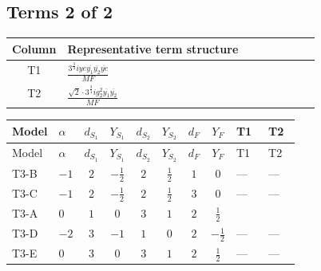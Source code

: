 \documentclass[8pt]{article}
\begin{document}
\begin{landscape}
\subsection*{Terms 2 of 2}
\begin{center}
\begin{tabular}{@{}c >{\raggedright\arraybackslash}p{0.82\linewidth}@{}}
\toprule
Column & Representative term structure \\
\midrule
T1 & \(\displaystyle \frac{3^{\frac{3}{4}} i ye \overline{y_{1}} \overline{y_{2}} \overline{ye}}{MF}\) \\
\midrule
T2 & \(\displaystyle \frac{\sqrt{2} \cdot 3^{\frac{3}{4}} i g_{2}^{2} \overline{y_{1}} \overline{y_{2}}}{MF}\) \\
\midrule
\bottomrule
\end{tabular}
\end{center}
\smallskip
\tiny
\begin{longtable}{@{}llcccccc >{\raggedright\arraybackslash}p{0.21\linewidth} >{\raggedright\arraybackslash}p{0.21\linewidth}@{}}
\toprule
Model & $\alpha$ & $d_{S_1}$ & $Y_{S_1}$ & $d_{S_2}$ & $Y_{S_2}$ & $d_F$ & $Y_F$ & T1 & T2 \\
\midrule
\endfirsthead
\toprule
Model & $\alpha$ & $d_{S_1}$ & $Y_{S_1}$ & $d_{S_2}$ & $Y_{S_2}$ & $d_F$ & $Y_F$ & T1 & T2 \\
\midrule
\endhead
T3-B & $-1$ & $2$ & $-\frac{1}{2}$ & $2$ & $\frac{1}{2}$ & $1$ & $0$ & --- & --- \\
\midrule
T3-C & $-1$ & $2$ & $-\frac{1}{2}$ & $2$ & $\frac{1}{2}$ & $3$ & $0$ & --- & --- \\
\midrule
T3-A & $0$ & $1$ & $0$ & $3$ & $1$ & $2$ & $\frac{1}{2}$ & \scriptsize\adjustbox{max width=\linewidth}{$\begin{gathered} - \frac{3^{\frac{3}{4}} i ye \overline{y_{1}} \overline{y_{2}} \overline{ye}}{12 MF}\end{gathered}$} & \scriptsize\adjustbox{max width=\linewidth}{$\begin{gathered} \frac{\sqrt{2} \cdot 3^{\frac{3}{4}} i g_{2}^{2} \overline{y_{1}} \overline{y_{2}}}{3 MF}\end{gathered}$} \\
\midrule
T3-D & $-2$ & $3$ & $-1$ & $1$ & $0$ & $2$ & $-\frac{1}{2}$ & --- & --- \\
\midrule
T3-E & $0$ & $3$ & $0$ & $3$ & $1$ & $2$ & $\frac{1}{2}$ & --- & --- \\
\midrule
\bottomrule
\end{longtable}
\clearpage

\end{landscape}
\end{document}
